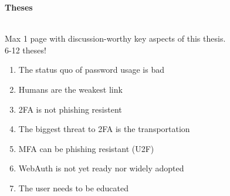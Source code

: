 \thispagestyle{noheader}

\begin{large}
	\textbf{Theses} \\ \\
\end{large}

Max 1 page with discussion-worthy key aspects of this thesis.\\
6-12 theses!

\begin{enumerate}
	\item The status quo of password usage is bad
	\item Humans are the weakest link
	\item 2FA is not phishing resistent
	\item The biggest threat to 2FA is the transportation
	\item MFA can be phishing resistant (U2F)
	\item WebAuth is not yet ready nor widely adopted
	\item The user needs to be educated
\end{enumerate}
